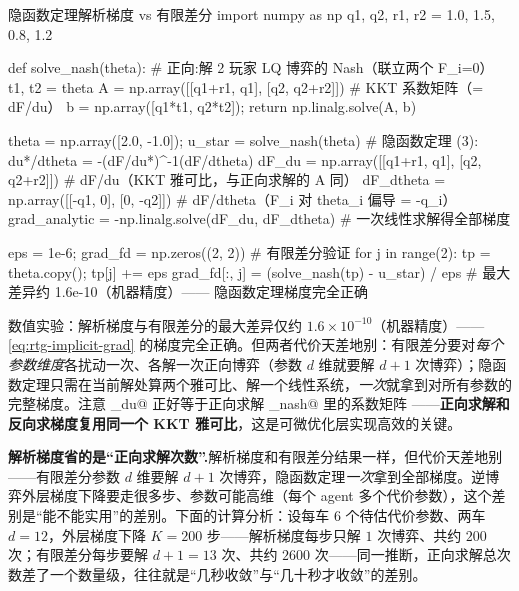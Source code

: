 \begin{codebox}[Python]{隐函数定理解析梯度 vs 有限差分}
import numpy as np
q1, q2, r1, r2 = 1.0, 1.5, 0.8, 1.2

def solve_nash(theta):                              # 正向:解 2 玩家 LQ 博弈的 Nash（联立两个 F_i=0）
    t1, t2 = theta
    A = np.array([[q1+r1, q1], [q2, q2+r2]])        # KKT 系数矩阵（= dF/du）
    b = np.array([q1*t1, q2*t2]); return np.linalg.solve(A, b)

theta = np.array([2.0, -1.0]); u_star = solve_nash(theta)
# 隐函数定理 (3): du*/dtheta = -(dF/du*)^{-1}(dF/dtheta)
dF_du     = np.array([[q1+r1, q1], [q2, q2+r2]])    # dF/du（KKT 雅可比，与正向求解的 A 同）
dF_dtheta = np.array([[-q1, 0], [0, -q2]])          # dF/dtheta（F_i 对 theta_i 偏导 = -q_i）
grad_analytic = -np.linalg.solve(dF_du, dF_dtheta) # 一次线性求解得全部梯度

eps = 1e-6; grad_fd = np.zeros((2, 2))             # 有限差分验证
for j in range(2):
    tp = theta.copy(); tp[j] += eps
    grad_fd[:, j] = (solve_nash(tp) - u_star) / eps
# 最大差异约 1.6e-10（机器精度）—— 隐函数定理梯度完全正确
\end{codebox}

\noindent 数值实验：解析梯度与有限差分的最大差异仅约 $1.6\times10^{-10}$（机器精度）——\cref{eq:rtg-implicit-grad} 的梯度完全正确\cite{peters2021inferring}。但两者代价天差地别：有限差分要对\emph{每个参数维度}各扰动一次、各解一次正向博弈（参数 $d$ 维就要解 $d+1$ 次博弈）；隐函数定理只需在当前解处算两个雅可比、解一个线性系统，\emph{一次}就拿到对所有参数的完整梯度。注意 \verb@dF_du@ 正好等于正向求解 \verb@solve_nash@ 里的系数矩阵 \verb@A@——\textbf{正向求解和反向求梯度复用同一个 KKT 雅可比}，这是可微优化层实现高效的关键。

\begin{insight}
\textbf{解析梯度省的是“正向求解次数”.}\;解析梯度和有限差分结果一样，但代价天差地别——有限差分参数 $d$ 维要解 $d+1$ 次博弈，隐函数定理\emph{一次}拿到全部梯度。逆博弈外层梯度下降要走很多步、参数可能高维（每个 agent 多个代价参数），这个差别是“能不能实用”的差别。下面的计算分析：设每车 $6$ 个待估代价参数、两车 $d=12$，外层梯度下降 $K=200$ 步——解析梯度每步只解 $1$ 次博弈、共约 $200$ 次；有限差分每步要解 $d+1=13$ 次、共约 $2600$ 次——同一推断，正向求解总次数差了一个数量级，往往就是“几秒收敛”与“几十秒才收敛”的差别。
\end{insight}

